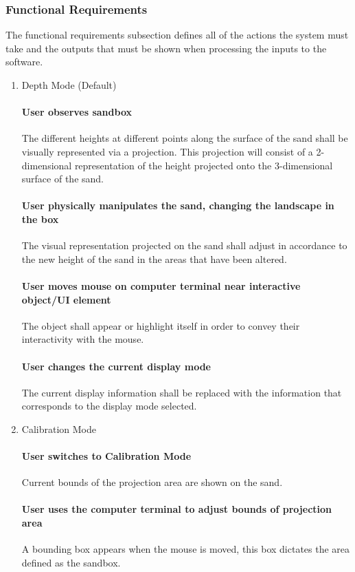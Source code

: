 \subsubsection{Functional Requirements}
The functional requirements subsection defines all of the actions the system must take and the outputs that must be shown when processing the inputs to the software.
\begin{enumerate}
\item{Depth Mode (Default)}

\paragraph{User observes sandbox}
The different heights at different points along the surface of the sand shall be visually represented via a projection.  This projection will consist of a 2-dimensional representation of the height projected onto the 3-dimensional surface of the sand.

\paragraph{User physically manipulates the sand, changing the landscape in the box}
The visual representation projected on the sand shall adjust in accordance to the new height of the sand in the areas that have been altered. 


\paragraph{User moves mouse on computer terminal near interactive object/UI element}
The object shall appear or highlight itself in order to convey their interactivity with the mouse.

\paragraph{User changes the current display mode}
The current display information shall be replaced with the information that corresponds to the display mode selected.

\item{Calibration Mode}
\paragraph{User switches to Calibration Mode}
Current bounds of the projection area are shown on the sand.


\paragraph{User uses the computer terminal to adjust bounds of projection area}
A bounding box appears when the mouse is moved, this box dictates the area defined as the sandbox.


\end{enumerate}
